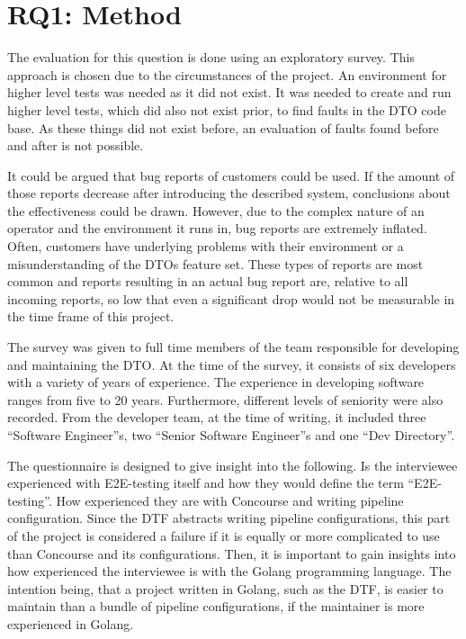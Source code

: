 \section{RQ1: Method}\label{sec:q1:-how-useful-is-the-dtf-in-a-practical-context?}

The evaluation for this question is done using an exploratory survey.
This approach is chosen due to the circumstances of the project.
An environment for higher level tests was needed as it did not exist.
It was needed to create and run higher level tests, which did also not exist prior, to find faults in the DTO code base.
As these things did not exist before, an evaluation of faults found before and after is not possible.

It could be argued that bug reports of customers could be used.
If the amount of those reports decrease after introducing the described system, conclusions about the effectiveness could be drawn.
However, due to the complex nature of an operator and the environment it runs in, bug reports are extremely inflated.
Often, customers have underlying problems with their environment or a misunderstanding of the DTOs feature set.
These types of reports are most common and reports resulting in an actual bug report are, relative to all incoming reports, so low that even a significant drop would not be measurable in the time frame of this project.

The survey was given to full time members of the team responsible for developing and maintaining the DTO.
At the time of the survey, it consists of six developers with a variety of years of experience.
The experience in developing software ranges from five to 20 years.
Furthermore, different levels of seniority were also recorded.
From the developer team, at the time of writing, it included three ``Software Engineer''s, two ``Senior Software Engineer''s and one ``Dev Directory''.

The questionnaire is designed to give insight into the following.
Is the interviewee experienced with E2E-testing itself and how they would define the term ``E2E-testing''.
How experienced they are with Concourse and writing pipeline configuration.
Since the DTF abstracts writing pipeline configurations, this part of the project is considered a failure if it is equally or more complicated to use than Concourse and its configurations.
Then, it is important to gain insights into how experienced the interviewee is with the Golang programming language.
The intention being, that a project written in Golang, such as the DTF, is easier to maintain than a bundle of pipeline configurations, if the maintainer is more experienced in Golang.

